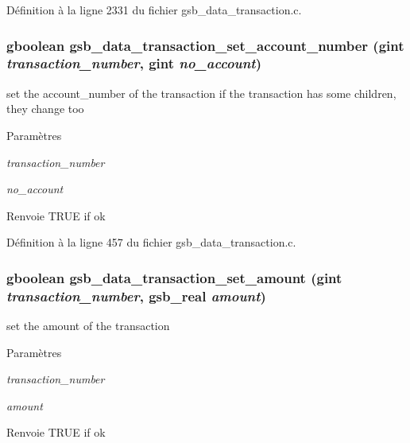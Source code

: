 Définition à la ligne 2331 du fichier gsb\_\-data\_\-transaction.c.

\subsubsection[{gsb\_\-data\_\-transaction\_\-set\_\-account\_\-number}]{\setlength{\rightskip}{0pt plus 5cm}gboolean gsb\_\-data\_\-transaction\_\-set\_\-account\_\-number (gint {\em transaction\_\-number}, \/  gint {\em no\_\-account})}\label{gsb__data__transaction_8c_a06c1da0256f9341801ea21685bb99186}
set the account\_\-number of the transaction if the transaction has some children, they change too


\begin{DoxyParams}{Paramètres}
\item[{\em transaction\_\-number}]\item[{\em no\_\-account}]\end{DoxyParams}
\begin{DoxyReturn}{Renvoie}
TRUE if ok 
\end{DoxyReturn}


Définition à la ligne 457 du fichier gsb\_\-data\_\-transaction.c.

\subsubsection[{gsb\_\-data\_\-transaction\_\-set\_\-amount}]{\setlength{\rightskip}{0pt plus 5cm}gboolean gsb\_\-data\_\-transaction\_\-set\_\-amount (gint {\em transaction\_\-number}, \/  {\bf gsb\_\-real} {\em amount})}\label{gsb__data__transaction_8c_a76fbbfabc4f16f0f8a51d843785862d7}
set the amount of the transaction


\begin{DoxyParams}{Paramètres}
\item[{\em transaction\_\-number}]\item[{\em amount}]\end{DoxyParams}
\begin{DoxyReturn}{Renvoie}
TRUE if ok 
\end{DoxyReturn}


